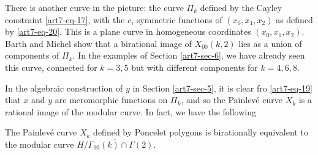 There is another curve in the picture: the curve $\Pi_{k}$ defined by the Cayley constraint \eqref{art7-eq-17}, with the $c_{i}$ symmetric functions of $(x_{0}, x_{1},x_{2})$ as defined by \eqref{art7-eq-20}. This is a plane curve in homogeneous coordinates $(x_{0},x_{1},x_{2})$. Barth and Michel show that a birational image of $X_{00}(k,2)$ lies as a union of components of $\Pi_{k}$. In the examples of Section \ref{art7-sec-6}, we have already seen this curve, connected for $k=3,5$ but with different components for $k=4,6,8$.

In the algebraic construction of $y$ in Section \ref{art7-sec-5}, it is clear fro \eqref{art7-eq-19} that $x$ and $y$ are meromorphic functions on $\Pi_{k}$, and so the Painlev\'e curve $X_{k}$ is a rational image of the modular curve. In fact, we have the following

\begin{prop}\label{art7-proposition-7}
The Painlev\'e curve $X_{k}$ defined by Poncelet polygons is birationally equivalent to the modular curve $\overline{H/\Gamma_{00}(k)\cap \Gamma(2)}$.
\end{prop}

